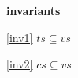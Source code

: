 \textbf{invariants}
\begin{block}
\item[ \eqref{inv1} ]$ts \subseteq vs $ %
\item[ \eqref{inv2} ]$cs \subseteq vs$ %
\end{block}
